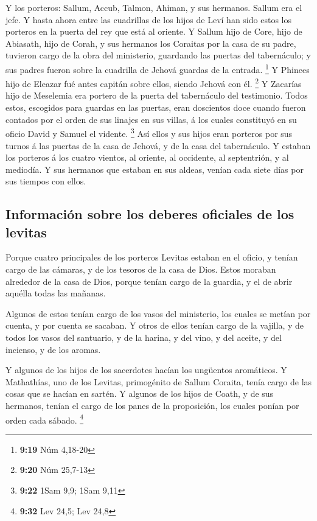  Y los porteros: Sallum, Accub, Talmon, Ahiman, y sus
hermanos. Sallum era el jefe.  Y hasta ahora entre las
cuadrillas de los hijos de Leví han sido estos los porteros en la puerta
del rey que está al oriente.  Y Sallum hijo de Core, hijo
de Abiasath, hijo de Corah, y sus hermanos los Coraitas por la casa de
su padre, tuvieron cargo de la obra del ministerio, guardando las
puertas del tabernáculo; y sus padres fueron sobre la cuadrilla de
Jehová guardas de la entrada. \footnote{\textbf{9:19} Núm 4,18-20}
 Y Phinees hijo de Eleazar fué antes capitán sobre ellos,
siendo Jehová con él. \footnote{\textbf{9:20} Núm 25,7-13}
 Y Zacarías hijo de Meselemia era portero de la puerta
del tabernáculo del testimonio.  Todos estos, escogidos
para guardas en las puertas, eran doscientos doce cuando fueron contados
por el orden de sus linajes en sus villas, á los cuales constituyó en su
oficio David y Samuel el vidente. \footnote{\textbf{9:22} 1Sam 9,9; 1Sam
  9,11}  Así ellos y sus hijos eran porteros por sus
turnos á las puertas de la casa de Jehová, y de la casa del tabernáculo.
 Y estaban los porteros á los cuatro vientos, al oriente,
al occidente, al septentrión, y al mediodía.  Y sus
hermanos que estaban en sus aldeas, venían cada siete días por sus
tiempos con ellos.

\hypertarget{informaciuxf3n-sobre-los-deberes-oficiales-de-los-levitas}{%
\subsection{Información sobre los deberes oficiales de los
levitas}\label{informaciuxf3n-sobre-los-deberes-oficiales-de-los-levitas}}

 Porque cuatro principales de los porteros Levitas
estaban en el oficio, y tenían cargo de las cámaras, y de los tesoros de
la casa de Dios.  Estos moraban alrededor de la casa de
Dios, porque tenían cargo de la guardia, y el de abrir aquélla todas las
mañanas.

 Algunos de estos tenían cargo de los vasos del
ministerio, los cuales se metían por cuenta, y por cuenta se sacaban.
 Y otros de ellos tenían cargo de la vajilla, y de todos
los vasos del santuario, y de la harina, y del vino, y del aceite, y del
incienso, y de los aromas.

 Y algunos de los hijos de los sacerdotes hacían los
ungüentos aromáticos.  Y Mathathías, uno de los Levitas,
primogénito de Sallum Coraita, tenía cargo de las cosas que se hacían en
sartén.  Y algunos de los hijos de Coath, y de sus
hermanos, tenían el cargo de los panes de la proposición, los cuales
ponían por orden cada sábado. \footnote{\textbf{9:32} Lev 24,5; Lev 24,8}


